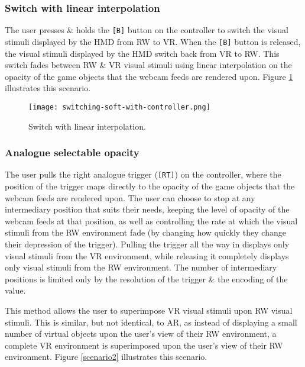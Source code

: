 
\subsubsection{Switch with linear interpolation}
The user presses \& holds the \texttt{[B]} button on the controller to switch the visual stimuli displayed by the HMD from RW to VR. When the \texttt{[B]} button is released, the visual stimuli displayed by the HMD switch back from VR to RW. This switch fades between RW \& VR  visual stimuli using linear interpolation on the opacity of the game objects that the webcam feeds are rendered upon. Figure \ref{scenario12} illustrates this scenario.

\begin{figure}[h]
	\begin{center}
		\texttt{[image: switching-soft-with-controller.png]}
		\caption{Switch with linear interpolation.}
		\label{scenario12}
	\end{center}
\end{figure}


\subsubsection{Analogue selectable opacity}
The user pulls the right analogue trigger (\texttt{[RT]}) on the controller, where the position of the trigger maps directly to the opacity of the game objects that the webcam feeds are rendered upon. The user can choose to stop at any intermediary position that suits their needs, keeping the level of opacity of the webcam feeds at that position, as well as controlling the rate at which the visual stimuli from the RW environment fade (by changing how quickly they change their depression of the trigger). Pulling the trigger all the way in displays only visual stimuli from the VR environment, while releasing it completely displays only visual stimuli from the RW environment. The number of intermediary positions is limited only by the resolution of the trigger \& the encoding of the value.

This method allows the user to superimpose VR visual stimuli upon RW visual stimuli. This is similar, but not identical, to AR, as instead of displaying a small number of virtual objects upon the user's view of their RW environment, a complete VR environment is superimposed upon the user's view of their RW environment. Figure \ref{scenario2} illustrates this scenario.

